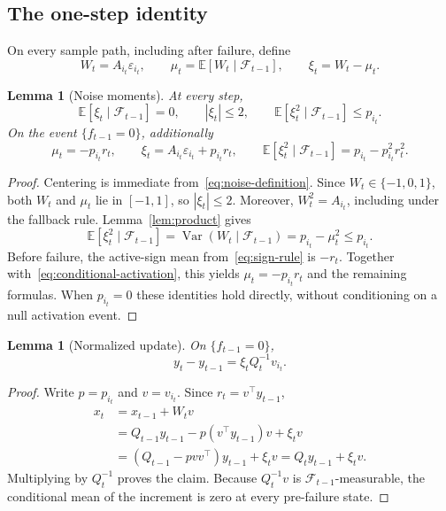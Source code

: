 \documentclass[11pt,a4paper]{article}
\numberwithin{equation}{section}
\newtheorem{lemma}[theorem]{Lemma}
\theoremstyle{remark}
\newcommand{\E}{\mathbb E}
\newcommand{\F}{\mathcal F}
\DeclareMathOperator{\Var}{Var}
\begin{document}
\subsection{The one-step identity}

On every sample path, including after failure, define
\begin{equation}\label{eq:noise-definition}
 W_t=A_{i_t}\varepsilon_{i_t},\qquad
 \mu_t=\E[W_t\mid\F_{t-1}],\qquad \xi_t=W_t-\mu_t.
\end{equation}

\begin{lemma}[Noise moments]
\label{lem:moments}
At every step,
\begin{equation}\label{eq:noise-bounds}
 \E[\xi_t\mid\F_{t-1}]=0,\qquad
 |\xi_t|\le2,\qquad
 \E[\xi_t^2\mid\F_{t-1}]\le p_{i_t}.
\end{equation}
On the event $\{f_{t-1}=0\}$, additionally
\begin{equation}\label{eq:safe-noise}
 \mu_t=-p_{i_t}r_t,\qquad
 \xi_t=A_{i_t}\varepsilon_{i_t}+p_{i_t}r_t,\qquad
 \E[\xi_t^2\mid\F_{t-1}]=p_{i_t}-p_{i_t}^2r_t^2.
\end{equation}
\end{lemma}
\begin{proof}
Centering is immediate from~\eqref{eq:noise-definition}.
Since $W_t\in\{-1,0,1\}$, both $W_t$ and $\mu_t$ lie in $[-1,1]$,
so $|\xi_t|\le2$. Moreover, $W_t^2=A_{i_t}$, including under the fallback
rule. Lemma~\ref{lem:product} gives
\[
 \E[\xi_t^2\mid\F_{t-1}]
 =\Var(W_t\mid\F_{t-1})
 =p_{i_t}-\mu_t^2\le p_{i_t}.
\]
Before failure, the active-sign mean from~\eqref{eq:sign-rule} is $-r_t$.
Together with~\eqref{eq:conditional-activation}, this yields
$\mu_t=-p_{i_t}r_t$ and the remaining formulas. When $p_{i_t}=0$ these
identities hold directly, without conditioning on a null activation event.
\end{proof}

\begin{lemma}[Normalized update]
\label{lem:update}
On $\{f_{t-1}=0\}$,
\begin{equation}\label{eq:normalized-update}
 y_t-y_{t-1}=\xi_tQ_t^{-1}v_{i_t}.
\end{equation}
\end{lemma}
\begin{proof}
Write $p=p_{i_t}$ and $v=v_{i_t}$. Since $r_t=v^\top y_{t-1}$,
\begin{align*}
 x_t
 &=x_{t-1}+W_t v\\
 &=Q_{t-1}y_{t-1}-p(v^\top y_{t-1})v+\xi_t v\\
 &=(Q_{t-1}-pvv^\top)y_{t-1}+\xi_t v
 =Q_t y_{t-1}+\xi_t v.
\end{align*}
Multiplying by $Q_t^{-1}$ proves the claim. Because $Q_t^{-1}v$ is
$\F_{t-1}$-measurable, the conditional mean of the increment is zero
at every pre-failure state.
\end{proof}
\end{document}
